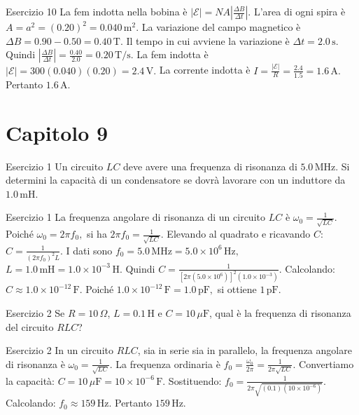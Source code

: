 \documentclass[a4paper]{article}
\begin{document}
\begin{snippetsolution}{Esercizio 10}
    La fem indotta nella bobina è
    \(|\mathcal{E}| = N A \left|\frac{\Delta B}{\Delta t}\right|.\)
    L'area di ogni spira è
    \(A = a^2 = (0.20)^2 = 0.040\,\mathrm{m^2}.\)
    La variazione del campo magnetico è
    \(\Delta B = 0.90 - 0.50 = 0.40\,\mathrm{T}.\)
    Il tempo in cui avviene la variazione è
    \(\Delta t = 2.0\,\mathrm{s}.\)
    Quindi
    \(\left|\frac{\Delta B}{\Delta t}\right| = \frac{0.40}{2.0} = 0.20\,\mathrm{T/s}.\)
    La fem indotta è
    \(|\mathcal{E}| = 300(0.040)(0.20) = 2.4\,\mathrm{V}.\)
    La corrente indotta è
    \(I = \frac{|\mathcal{E}|}{R} = \frac{2.4}{1.5} = 1.6\,\mathrm{A}.\)
    Pertanto
    \(\boxed{1.6\,\mathrm{A}}.\)
\end{snippetsolution}
\pagebreak
\section{Capitolo 9}
\begin{snippetexercise}{Esercizio 1}
    Un circuito \(LC\) deve avere una frequenza di risonanza di
    \(5.0\,\mathrm{MHz}\). Si determini la capacità di un condensatore se
    dovrà lavorare con un induttore da \(1.0\,\mathrm{mH}\).

\end{snippetexercise}
\begin{snippetsolution}{Esercizio 1}
    La frequenza angolare di risonanza di un circuito \(LC\) è
    \(\omega_0 = \frac{1}{\sqrt{LC}}.\)
    Poiché
    \(\omega_0 = 2\pi f_0,\)
    si ha
    \(2\pi f_0 = \frac{1}{\sqrt{LC}}.\)
    Elevando al quadrato e ricavando \(C\):
    \(C = \frac{1}{(2\pi f_0)^2L}.\)
    I dati sono
    \(f_0 = 5.0\,\mathrm{MHz} = 5.0 \times 10^6\,\mathrm{Hz},\)
    \(L = 1.0\,\mathrm{mH} = 1.0 \times 10^{-3}\,\mathrm{H}.\)
    Quindi
    \(C = \frac{1} { \left[ 2\pi \left(5.0 \times 10^6\right) \right]^2 \left(1.0 \times 10^{-3}\right) }.\)
    Calcolando:
    \(C \approx 1.0 \times 10^{-12}\,\mathrm{F}.\)
    Poiché
    \(1.0 \times 10^{-12}\,\mathrm{F} = 1.0\,\mathrm{pF},\)
    si ottiene
    \(\boxed{1\,\mathrm{pF}}.\)
\end{snippetsolution}
\begin{snippetexercise}{Esercizio 2}
    Se \(R = 10\,\Omega\), \(L = 0.1\,\mathrm{H}\) e
    \(C = 10\,\mu\mathrm{F}\), qual è la frequenza di risonanza del circuito
    \(RLC\)?

\end{snippetexercise}
\begin{snippetsolution}{Esercizio 2}
    In un circuito \(RLC\), sia in serie sia in parallelo, la frequenza
    angolare di risonanza è
    \(\omega_0 = \frac{1}{\sqrt{LC}}.\)
    La frequenza ordinaria è
    \(f_0 = \frac{\omega_0}{2\pi} = \frac{1}{2\pi\sqrt{LC}}.\)
    Convertiamo la capacità:
    \(C = 10\,\mu\mathrm{F} = 10 \times 10^{-6}\,\mathrm{F}.\)
    Sostituendo:
    \(f_0 = \frac{1} { 2\pi \sqrt{ \left(0.1\right) \left(10 \times 10^{-6}\right) } }.\)
    Calcolando:
    \(f_0 \approx 159\,\mathrm{Hz}.\)
    Pertanto
    \(\boxed{159\,\mathrm{Hz}}.\)
\end{snippetsolution}
\end{document}
